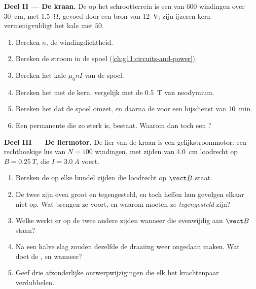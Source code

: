 \begin{problem}
\medskip
\noindent\textbf{Deel II --- De kraan.}
De  op het schrootterrein is een  van $600$
windingen over \qty{30}{cm}, met  \qty{1.5}{\ohm}, gevoed door
een bron van \qty{12}{V}; zijn ijzeren kern vermenigvuldigt het kale 
met $50$.
\begin{enumerate}[resume]
  \item Bereken $n$, de windingdichtheid.
  \item Bereken de stroom in de spoel
        (\cref{ch:g11:circuits-and-power}).
  \item Bereken het kale  $\mu_0 n I$ van de spoel.
  \item Bereken het  met de kern; vergelijk met de \qty{0.5}{T} van
        neodymium.
  \item Bereken het  dat de spoel omzet, en daarna de 
        voor een hijsdienst van \qty{10}{\minute}.
  \item Een permanente  die zo sterk is, bestaat. Waarom dan toch
        een ?
\end{enumerate}

\medskip
\noindent\textbf{Deel III --- De liermotor.}
De lier van de kraan is een gelijkstroommotor: een rechthoekige lus van
$N = 100$ windingen, met zijden van \qty{4.0}{cm} loodrecht op
$B = \qty{0.25}{T}$, die $I = \qty{3.0}{A}$ voert.
\begin{enumerate}[resume]
  \item Bereken de  op elke bundel zijden die loodrecht op
        $\vect B$ staat.
  \item De twee  zijn even groot en tegengesteld, en toch heffen
        hun gevolgen elkaar niet op. Wat brengen ze voort, en waarom
        moeten ze \emph{tegengesteld} zijn?
  \item Welke  werkt er op de twee andere zijden wanneer die
        evenwijdig aan $\vect B$ staan?
  \item Na een halve slag zouden dezelfde  de draaiing weer
        ongedaan maken. Wat doet de , en wanneer?
  \item Geef drie afzonderlijke ontwerpwijzigingen die elk het
        krachtenpaar verdubbelen.
\end{enumerate}


\end{problem}
